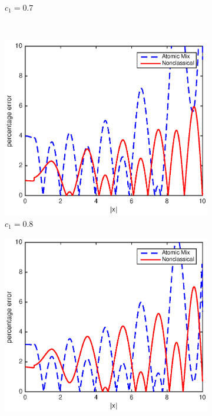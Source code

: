 \documentclass[12pt]{article}
\begin{document}
{\begin{figure}[p]
\begin{subfigure}{0.495\textwidth}
        \caption{$c_1 = 0.7$}
        \label{figerrB70}
    \end{subfigure}
    \\
    \centering
    \begin{subfigure}{0.495\textwidth}
        \centering
        \includegraphics[width=\textwidth]{NSE_err_B80.eps}
        \caption{$c_1 = 0.8$}
        \label{figerrB80}
    \end{subfigure}
    \hfill
    \begin{subfigure}{0.495\textwidth}
        \centering
        \includegraphics[width=\textwidth]{NSE_err_B90.eps}

\end{subfigure}
\end{figure}}
\end{document}
